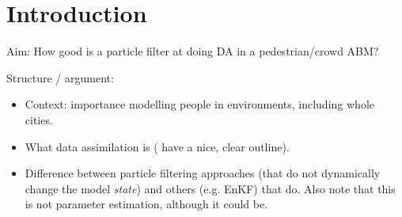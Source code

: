 \section{Introduction\label{introduction}}

Aim: How good is a particle filter at doing DA in a pedestrian/crowd ABM?

Structure / argument:
\begin{itemize}
\item Context: importance modelling people in environments, including whole cities.
\item What data assimilation is (\citet{wang_data_2015} have a nice, clear outline).
\item Difference between particle filtering approaches (that do not dynamically change the model \textit{state}) and others (e.g. EnKF) that do. Also note that this is not parameter estimation, although it could be.
\end{itemize}
